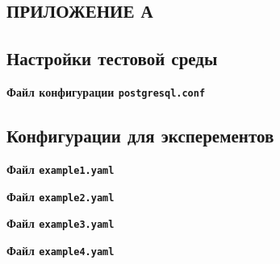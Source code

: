 \begin{center}
    \section*{ПРИЛОЖЕНИЕ А}
\end{center}

\subsection*{Настройки тестовой среды}

\label{app:postgresql_conf}
\begin{center}
    \textbf{Файл конфигурации \texttt{postgresql.conf}}
\end{center}



\subsection*{Конфигурации для эксперементов}

\label{app:example1}
\begin{center}
    \textbf{Файл \texttt{example1.yaml}}
\end{center}


\label{app:example2}
\begin{center}
    \textbf{Файл \texttt{example2.yaml}}
\end{center}


\label{app:example3}
\begin{center}
    \textbf{Файл \texttt{example3.yaml}}
\end{center}


\label{app:example4}
\begin{center}
    \textbf{Файл \texttt{example4.yaml}}
\end{center}

